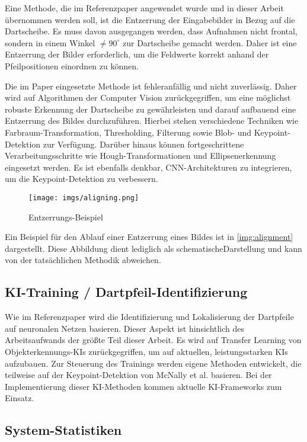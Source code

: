 Eine Methode, die im Referenzpaper angewendet wurde und in dieser Arbeit übernommen werden soll, ist die Entzerrung der Eingabebilder in Bezug auf die Dartscheibe. Es muss davon ausgegangen werden, dass Aufnahmen nicht frontal, sondern in einem Winkel $\neq90^\circ$ zur Dartscheibe gemacht werden. Daher ist eine Entzerrung der Bilder erforderlich, um die Feldwerte korrekt anhand der Pfeilpositionen einordnen zu können.

Die im Paper eingesetzte Methode ist fehleranfällig und nicht zuverlässig. Daher wird auf Algorithmen der Computer Vision zurückgegriffen, um eine möglichst robuste Erkennung der Dartscheibe zu gewährleisten und darauf aufbauend eine Entzerrung des Bildes durchzuführen. Hierbei stehen verschiedene Techniken wie Farbraum-Transformation, Thresholding, Filterung sowie Blob- und Keypoint-Detektion zur Verfügung. Darüber hinaus können fortgeschrittene Verarbeitungsschritte wie Hough-Transformationen und Ellipsenerkennung eingesetzt werden. Es ist ebenfalls denkbar, CNN-Architekturen zu integrieren, um die Keypoint-Detektion zu verbessern.

\begin{figure}
    \centering
    \texttt{[image: imgs/aligning.png]}
    \caption{Entzerrungs-Beispiel}
    \label{img:alignment}
\end{figure}

Ein Beispiel für den Ablauf einer Entzerrung eines Bildes ist in \autoref{img:alignment} dargestellt. Diese Abbildung dient lediglich als schematischeDarstellung und kann von der tatsächlichen Methodik abweichen.

\subsection{KI-Training / Dartpfeil-Identifizierung}
\label{sec:methodik:ki}

Wie im Referenzpaper wird die Identifizierung und Lokalisierung der Dartpfeile auf neuronalen Netzen basieren. Dieser Aspekt ist hinsichtlich des Arbeitsaufwands der größte Teil dieser Arbeit. Es wird auf Transfer Learning von Objekterkennungs-KIs zurückgegriffen, um auf aktuellen, leistungsstarken KIs aufzubauen. Zur Steuerung des Trainings werden eigene Methoden entwickelt, die teilweise auf der Keypoint-Detektion von McNally et al. basieren. Bei der Implementierung dieser KI-Methoden kommen aktuelle KI-Frameworks zum Einsatz.

\subsection{System-Statistiken}
\label{sec:methodik:statistiken}

